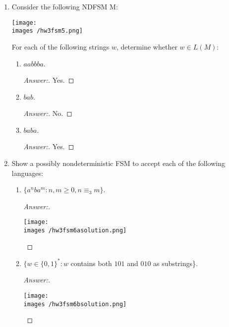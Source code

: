 \documentclass[10pt]{article}
\newcommand{\images}{/home/gparker/classes/341/images}
\begin{document}
\begin{enumerate}
\pagebreak

\item
Consider the following NDFSM M: \\

\begin{center}
\texttt{[image: \\images /hw3fsm5.png]}
\end{center}

For each of the following strings $w$, determine whether $w \in L(M)$:
\begin{enumerate}
\item
$aabbba$.
\begin{proof}[Answer:]
Yes.
\end{proof}

\item
$bab$.
\begin{proof}[Answer:]
No.
\end{proof}

\item
$baba$.
\begin{proof}[Answer:]
Yes.
\end{proof}
\end{enumerate}

\pagebreak

\item
Show a possibly nondeterministic FSM to accept each of the following languages:
\begin{enumerate}

\item
$\{a^nba^m : n, m \geq 0, n \equiv _3 m\}$.
\begin{proof}[Answer:] $ $\\
\begin{flushleft}
\texttt{[image: \\images /hw3fsm6asolution.png]}
\end{flushleft}
\end{proof}

\item
$\{w \in \{0, 1\}^* : w$ contains both $101$ and $010$ as substrings\}.
\begin{proof}[Answer:] $ $\\
\begin{flushleft}
\texttt{[image: \\images /hw3fsm6bsolution.png]}
\end{flushleft}
\end{proof}
\end{enumerate}

\addtocounter{enumi}{2}


\end{enumerate}
\end{document}
